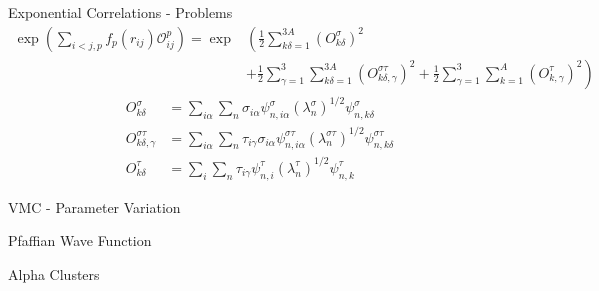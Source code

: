 \documentclass{beamer}
\newcommand{\red}[1]{{\color{red}{#1}}}
\newcommand{\Opij}{\mathcal{O}_{ij}^p}
\begin{document}
\begin{frame}{Exponential Correlations - Problems}
\begin{equation*}
\begin{split}
   \exp\left(\sum\limits_{i<j,p}f_p(r_{ij})\Opij\right) = \exp&\left(\frac{1}{2}\sum\limits_{k\delta=1}^{3A} \left(O_{k\delta}^{\sigma}\right)^2\right. \\
      & \left. + \frac{1}{2}\sum\limits_{\gamma=1}^{3}\sum\limits_{k\delta=1}^{3A} \left(O_{k\delta,\gamma}^{\sigma\tau}\right)^2
      + \frac{1}{2}\sum\limits_{\gamma=1}^{3}\sum\limits_{k=1}^{A} \left(O_{k,\gamma}^{\tau}\right)^2\right)
\end{split}
\end{equation*}
\begin{equation*}
\begin{split}
   O_{k\delta}^{\sigma} &= \sum\limits_{i\alpha}\sum\limits_n \sigma_{i\alpha}\psi_{n,i\alpha}^\sigma\left(\lambda_n^\sigma\right)^{1/2}\psi_{n,k\delta}^{\sigma} \\
   O_{k\delta,\gamma}^{\sigma\tau} &= \sum\limits_{i\alpha}\sum\limits_n \tau_{i\gamma}\sigma_{i\alpha}\psi_{n,i\alpha}^{\sigma\tau}\left(\lambda_n^{\sigma\tau}\right)^{1/2}\psi_{n,k\delta}^{\sigma\tau} \\
   O_{k\delta}^{\tau} &= \sum\limits_{i}\sum\limits_n \tau_{i\gamma}\psi_{n,i}^\tau\left(\lambda_n^\tau\right)^{1/2}\psi_{n,k}^{\tau}
\end{split}
\end{equation*}
\end{frame}

\begin{frame}{VMC - Parameter Variation}
   \red{EXPLAIN HOW THE PARAMETARS ARE VARIED IN VMC.}
\end{frame}

\begin{frame}{Pfaffian Wave Function}
   \red{FINISH THIS! Maybe call it the BCS wave function, which we calculate as a pfaffian of paired orbitals.}
\end{frame}

\begin{frame}{Alpha Clusters}
\red{WHY ARE CLUSTERS IMPORTANT? ARE THEY NORMALLY DONE WITH SOME MODEL, NOT AB INITIO LIKE WE ARE DOING? ARE THEY ARE LEAST WRITTEN IN TERMS OF P, N, AND ALPHA DEGREES OF FREEDOM? WE ARE ONLY USING N AND P.}
\end{frame}


\end{document}
